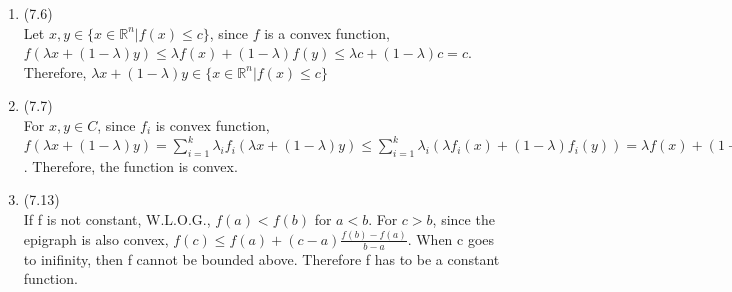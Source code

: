 \documentclass[letterpaper,12pt]{article}
\theoremstyle{definition}
\begin{document}
\begin{enumerate}
	\item(7.6)\\
	Let $x, y \in \{ x \in \mathbb{R}^{n}| f(x) \leq c\}$, since $f$ is a convex function, $f(\lambda x + (1 - \lambda) y) \leq \lambda f(x) + (1 - \lambda) f(y) \leq \lambda c + (1 - \lambda) c = c$. Therefore, $\lambda x + (1 - \lambda) y \in \{ x \in \mathbb{R}^{n}| f(x) \leq c\} $\\

	\item(7.7)\\
	For $x, y \in C$, since $f_{i}$ is convex function, $f(\lambda x + (1 - \lambda) y) = \sum_{i =  1}^{k}\lambda_{i}f_{i}(\lambda x + (1 - \lambda) y) \leq  \sum_{i =  1}^{k}\lambda_{i}(\lambda f_{i}(x) + (1 - \lambda)f_{i}(y)) = \lambda f(x) + (1 - \lambda) f(y)$. Therefore, the function is convex.\\

	\item(7.13)\\
	If f is not constant, W.L.O.G., $f(a) < f(b)$ for $a < b$. For $c > b$, since the epigraph is also convex, $f(c) \leq f(a) + (c - a)\frac{f(b) - f(a)}{b - a}$. When c goes to inifinity, then f cannot be bounded above. Therefore f has to be a constant function.\\

	
	

\end{enumerate}

\vspace{25mm}
\end{document}
